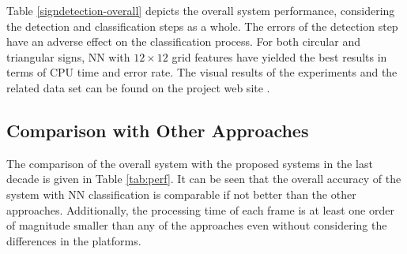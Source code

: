 \documentclass[review,number]{elsarticle}
\begin{document}
Table \ref{signdetection-overall} depicts the overall system performance, considering the detection and classification steps as a whole.  The errors of the detection step have an adverse effect on the classification process. For both circular and triangular signs, NN with $12 \times 12$ grid features have yielded the best results in terms of CPU time and error rate. The visual results of the experiments and the related data set can be found on the project web site \cite{miscbib04}.

\subsection{Comparison with Other Approaches}

The comparison of the overall system with the proposed systems in the last decade is given in Table \ref{tab:perf}. It can be seen that the overall accuracy of the system with NN classification is comparable if not better than the other approaches. Additionally,  the processing time of each frame is at least one order of magnitude smaller than any of the approaches even without considering the differences in the platforms.
\end{document}
